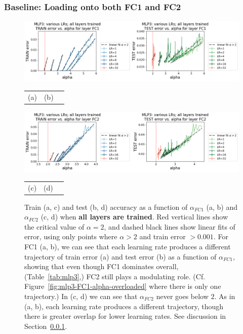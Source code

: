 \subsubsection{Baseline: Loading onto both FC1 and FC2}
\label{sxn:hysteresis_baseline}
\begin{figure}[t] %
    \centering
        \includegraphics[width=15cm]{img/alpha_by_scales/mlp3_error_by_LR_all_FC1_binned.png} \\
    \begin{tabular}{ccc}
      (a)\hspace{5cm} & (b) 
    \end{tabular}
        \includegraphics[width=15cm]{img/alpha_by_scales/mlp3_error_by_LR_all_FC2_binned.png}
    \begin{tabular}{ccc}
      (c)\hspace{5cm} & (d) \\
    \end{tabular}
    \caption{
        Train (a, c) and test (b, d) accuracy as a function of $\alpha_{FC1}$ (a, b) and $\alpha_{FC2}$ (c, d) when {\bf all 
        layers are trained}. Red vertical lines show the critical value of $\alpha = 2$, and dashed black lines show 
        linear fits of error, using only points where $\alpha > 2$ and train error $> 0.001$. 
        For FC1 (a, b), we can see that each learning rate 
        produces a different trajectory of train error (a) and test error (b) as a function of $\alpha_{FC1}$, 
        showing that even though FC1 dominates overall, (Table~\ref{tab:mlp3},) FC2 still plays a modulating role. 
        (Cf. Figure~\ref{fig:mlp3-FC1-alpha-overloaded} where there is only one trajectory.)
        In (c, d) we can see that $\alpha_{FC2}$ never goes below $2$. As in (a, b), each learning rate 
        produces a different trajectory, though there is greater overlap for lower learning rates. See discussion in 
        Section~\ref{sxn:hysteresis_baseline}.
    }
    \label{fig:mlp3-baseline-load}
\end{figure}


